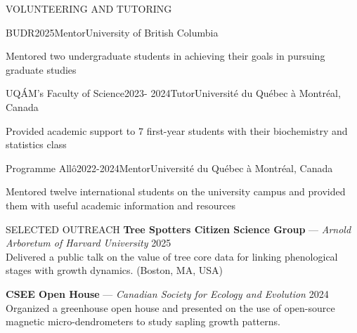 \documentclass[
	11pt, %
]{resume} %
\begin{document}
\begin{rSection}{VOLUNTEERING AND TUTORING}
	\begin{rSubsection}{BUDR}{2025}{Mentor}{University of British Columbia}
		\item Mentored two undergraduate students in achieving their goals in pursuing graduate studies
	\end{rSubsection}
	\begin{rSubsection}{UQÁM's Faculty of Science}{2023- 2024}{Tutor}{Université du Québec à Montréal, Canada}
		\item Provided academic support to 7 first-year students with their biochemistry and statistics class
	\end{rSubsection}
	\begin{rSubsection}{Programme Allô}{2022-2024}{Mentor}{Université du Québec à Montréal, Canada}
		\item Mentored twelve international students on the university campus and provided them with useful academic information and resources
	\end{rSubsection}
\end{rSection}

\begin{rSection}{SELECTED OUTREACH}
  \textbf{Tree Spotters Citizen Science Group} — \textit{Arnold Arboretum of Harvard University} \hfill 2025 \\
  Delivered a public talk on the value of tree core data for linking phenological stages with growth dynamics. (Boston, MA, USA) 

  \textbf{CSEE Open House} — \textit{Canadian Society for Ecology and Evolution} \hfill 2024 \\
  Organized a greenhouse open house and presented on the use of open-source magnetic micro-dendrometers to study sapling growth patterns.
\end{rSection}
\end{document}
